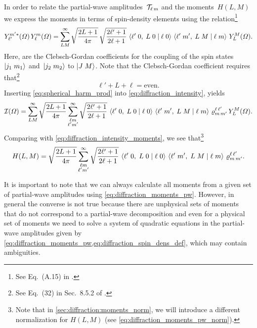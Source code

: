 In order to relate the partial-wave amplitudes~$\mathcal{T}_{\ell\,
m}$ and the moments~$H(L, M)$ we express the moments in terms of
spin-density elements using the relation\footnote{See Eq.~(A.15) in
.}
\begin{equation}
  \label{eq:spherical_harm_prod}
  Y_{\ell'}^{m' *}(\Omega)\, Y_{\ell}^m(\Omega)
  = \sum_{L M}^\infty \sqrt{\frac{2 L + 1}{4 \pi}}\, \sqrt{\frac{2 \ell' + 1}{2 \ell + 1}}\, \braket{{\ell'}\;{0},\;{L}\;{0}\; |\; {\ell}\;{0}}\, \braket{{\ell'}\;{m'},\;{L}\;{M}\; |\; {\ell}\;{m}}\, Y_L^M(\Omega).
\end{equation}
Here,  are the Clebsch-Gordan
coefficients for the coupling of the spin states $\ket{j_1\; m_1}$
and~$\ket{j_2\; m_2}$ to $\ket{J\; M}$.  Note that the Clebsch-Gordan
coefficient  requires
that\footnote{See Eq.~(32) in Sec.~8.5.2 of
.}
\begin{equation}
  \label{eq:ang_mom_sum}
  \ell' + L + \ell
  = \text{even}.
\end{equation}
Inserting \cref{eq:spherical_harm_prod} into
\cref{eq:diffraction_intensity}, yields
\begin{equation}
  \mathcal{I}(\Omega)
  = \sum_{L M}^\infty \sqrt{\frac{2 L + 1}{4 \pi}} \sum_{\substack{\ell m \\ \ell' m'}}^\infty
  \sqrt{\frac{2 \ell' + 1}{2 \ell + 1}}\, \braket{{\ell'}\;{0},\;{L}\;{0}\; |\; {\ell}\;{0}}\, \braket{{\ell'}\;{m'},\;{L}\;{M}\; |\; {\ell}\;{m}}\,
  \varrho^{\ell\, \ell'}_{m\, m'}\, Y_L^M(\Omega).
\end{equation}
Comparing with \cref{eq:diffraction_intensity_moments}, we see
that\footnote{Note that in \cref{sec:diffraction:moments_norm}, we
will introduce a different normalization for $H(L, M)$ (see
\cref{eq:diffraction_moments_pw_norm}).}
\begin{equation}
  \label{eq:diffraction_moments_pw}
  H(L, M)
  = \sqrt{\frac{2 L + 1}{4 \pi}} \sum_{\substack{\ell m \\ \ell' m'}}^\infty
  \sqrt{\frac{2 \ell' + 1}{2 \ell + 1}}\,
  \braket{{\ell'}\;{0},\;{L}\;{0}\; |\; {\ell}\;{0}}\, \braket{{\ell'}\;{m'},\;{L}\;{M}\; |\; {\ell}\;{m}}\,
  \varrho^{\ell\, \ell'}_{m\, m'}.
\end{equation}

It is important to note that we can always calculate all moments from
a given set of partial-wave amplitudes using
\cref{eq:diffraction_moments_pw}.  However, in general the converse is
not true because there are unphysical sets of moments that do not
correspond to a partial-wave decomposition and even for a physical set
of moments we need to solve a system of quadratic equations in the
partial-wave amplitudes given by
\cref{eq:diffraction_moments_pw,eq:diffraction_spin_dens_def}, which
may contain ambiguities.

